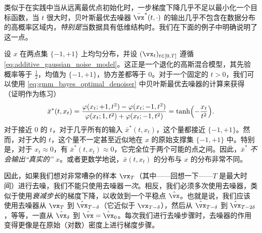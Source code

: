 \documentclass[../../book-main_zh.tex]{subfiles}
\begin{document}
类似于在实践中当从远离最优点初始化时，一步梯度下降几乎不足以最小化一个目标函数，当 \(t\) 很大时，贝叶斯最优去噪器 \(\bar{\vx}^{\ast}(t, \cdot)\) 的输出几乎不包含在数据分布的高概率区域内，\textit{特别是}当数据具有低维结构时。我们在下面的例子中明确说明了这一点。
\begin{example}[去噪一个两点混合分布]\label{example:denoising_twopoints}
	设 \(x\) 在两点集 \(\{-1, +1\}\) 上均匀分布，并设 \((\vx_{t})_{t \in [0, T]}\) 遵循 \eqref{eq:additive_gaussian_noise_model}。这正是一个退化的高斯混合模型，其先验概率等于 \(\frac{1}{2}\)，均值为 \(\{-1, +1\}\)，协方差都等于 \(0\)。对于一个固定的 \(t > 0\)，我们可以使用 \eqref{eq:gmm_bayes_optimal_denoiser} 中贝叶斯最优去噪器的计算来获得（证明作为练习）
	\begin{equation}
		\bar{x}^{\ast}(t, x_{t}) = \frac{\phi(x_{t} ; +1, t^{2}) - \phi(x_{t}
		; -1, t^{2})}{\phi(x_{t} ; 1, t^{2}) + \phi(x_{t} ; -1, t^{2})} = \tanh\rp{-\frac{x_{t}}{t^{2}}}.
	\end{equation}
	对于接近 \(0\) 的 \(t\)，对于几乎所有的输入 \(\bar{x}^{\ast}(t, x_{t})\)，这个量都接近 \(\{-1, +1\}\)。然而，对于大的 \(t\)，这个量不一定甚至近似地在 \(x\) 的原始支撑集 \(\{-1, +1\}\) 中。特别是，对于 \(x_{t} \approx 0\)，有 \(\bar{x}^{\ast}(t, x_{t}) \approx 0\)，它完全位于两个可能的点之间。因此，\(\bar{x}^{\ast}\) \textit{不会输出“真实的” \(x\)}。或者更数学地说，\(\bar{x}(t, x_{t})\) 的分布与 \(x\) 的分布非常不同。
\end{example}

因此，如果我们想对非常嘈杂的样本 \(\vx_{T}\)（其中——回想一下——\(T\) 是最大时间）进行去噪，我们不能只使用去噪器\textit{一次}。相反，我们必须多次使用去噪器，类似于使用\textit{衰减步长}的梯度下降，以收敛到一个平稳点 \(\hat{\vx}\)。也就是说，我们应该使用去噪器从 \(\vx_{T}\) 到 \(\hat{\vx}_{T - \delta}\)（它近似于 \(\vx_{T - \delta}\)），然后从 \(\hat{\vx}_{T - \delta}\) 到 \(\hat{\vx}_{T - 2\delta}\)，等等，一直从 \(\hat{\vx}_{\delta}\) 到 \(\hat{\vx} = \hat{\vx}_{0}\)。每次我们进行去噪步骤时，去噪器的作用变得更像是在原始（对数）密度上进行梯度步骤。
\end{document}

